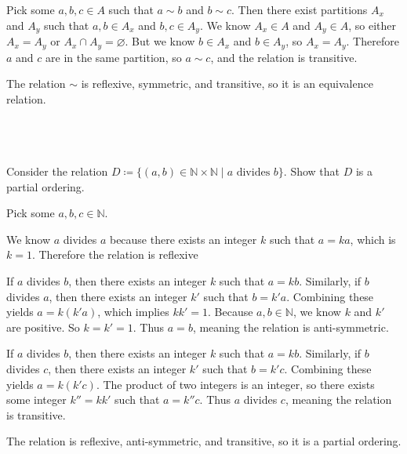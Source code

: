 \documentclass{article}
\begin{document}
Pick some $a,b,c\in A$ such that $a\sim b$ and $b\sim c$. Then there exist partitions $A_{x}$ and $A_{y}$ such that $a,b\in A_{x}$ and $b,c\in A_{y}$. We know $A_{x} \in A$ and $A_{y} \in A$, so either $A_{x} =A_{y}$ or $A_{x} \cap A_{y} =\varnothing $. But we know $b\in A_{x}$ and $b\in A_{y}$, so $A_{x} =A_{y}$. Therefore $a$ and $c$ are in the same partition, so $a\sim c$, and the relation is transitive.



The relation $\sim $ is reflexive, symmetric, and transitive, so it is an equivalence relation. 

\
\hline
\section{}

\begin{problem*}
Consider the relation $D\coloneqq \{(a,b)\in \mathbb{N}\times \mathbb{N}\mid a\text{ divides }b\}$. Show that $D$ is a partial ordering. 
\end{problem*}

Pick some $a,b,c\in \mathbb{N}$.



We know $a$ divides $a$ because there exists an integer $k$ such that $a=ka$, which is $k=1$. Therefore the relation is reflexive



If $a$ divides $b$, then there exists an integer $k$ such that $a=kb$. Similarly, if $b$ divides $a$, then there exists an integer $k'$ such that $b=k'a$. Combining these yields $a=k( k'a)$, which implies $kk'=1$. Because $a,b\in \mathbb{N}$, we know $k$ and $k'$ are positive. So $k=k'=1$. Thus $a=b$, meaning the relation is anti-symmetric.



If $a$ divides $b$, then there exists an integer $k$ such that $a=kb$. Similarly, if $b$ divides $c$, then there exists an integer $k'$ such that $b=k'c$. Combining these yields $a=k( k'c)$. The product of two integers is an integer, so there exists some integer $k''=kk'$ such that $a=k''c$. Thus $a$ divides $c$, meaning the relation is transitive.



The relation is reflexive, anti-symmetric, and transitive, so it is a partial ordering.

\
\hline
\end{document}
